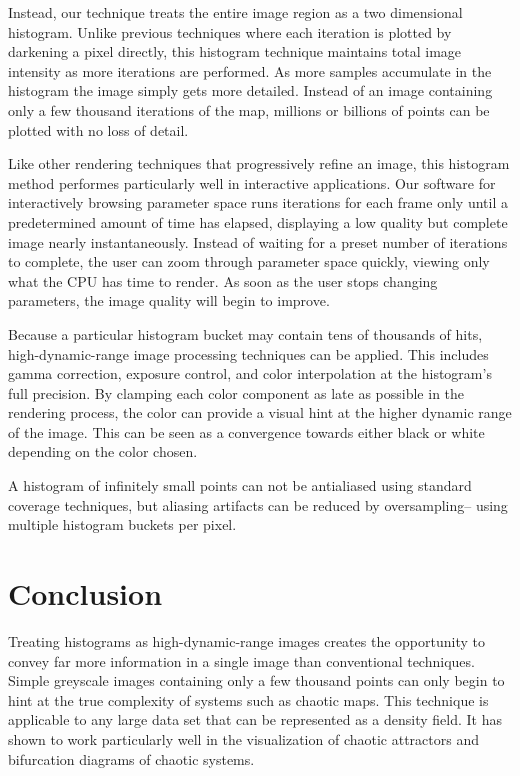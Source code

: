 \documentclass{acmsiggraph}
\begin{document}
Instead, our technique treats the entire image region as a two dimensional
histogram. Unlike previous techniques where each iteration is plotted by
darkening a pixel directly, this histogram technique maintains total image
intensity as more iterations are performed. As more samples accumulate in the
histogram the image simply gets more detailed. Instead of an image containing
only a few thousand iterations of the map, millions or billions of points can
be plotted with no loss of detail.

Like other rendering techniques that progressively refine an image, this
histogram method performes particularly well in interactive applications.
Our software for interactively browsing parameter space runs iterations
for each frame only until a predetermined amount of time has elapsed,
displaying a low quality but complete image nearly instantaneously.
Instead of waiting for a preset number of iterations to complete, the user
can zoom through parameter space quickly, viewing only what the CPU has time
to render. As soon as the user stops changing parameters, the image quality
will begin to improve.

Because a particular histogram bucket may contain tens of thousands of hits,
high-dynamic-range image processing techniques can be applied. This includes
gamma correction, exposure control, and color interpolation at the histogram's
full precision. By clamping each color component as late as possible in the
rendering process, the color can provide a visual hint at the higher
dynamic range of the image. This can be seen as a convergence towards either
black or white depending on the color chosen.

A histogram of infinitely small points can not be antialiased using standard
coverage techniques, but aliasing artifacts can be reduced by
oversampling-- using multiple histogram buckets per pixel.

\section{Conclusion}
Treating histograms as high-dynamic-range images creates the opportunity to
convey far more information in a single image than conventional techniques.
Simple greyscale images containing only a few thousand points can only begin
to hint at the true complexity of systems such as chaotic maps. This technique
is applicable to any large data set that can be represented as a density field.
It has shown to work particularly well in the visualization of chaotic
attractors and bifurcation diagrams of chaotic systems.
\end{document}
